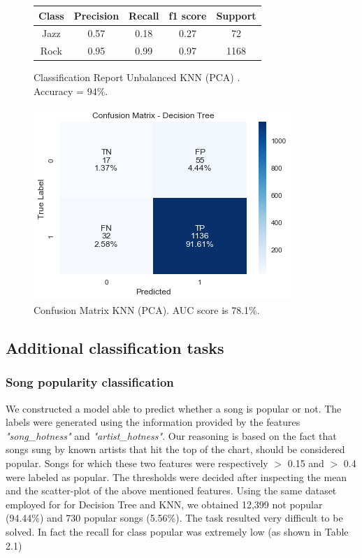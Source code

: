 \begin{figure}[!htb]
   \begin{minipage}{0.56\textwidth}
     \begin{tabular}{ccccc}
     \hline
     \textbf{Class} & \textbf{Precision} & \textbf{Recall} & \textbf{f1 score} & \textbf{Support} \\ \hline
     Jazz          & 0.57               & 0.18            & 0.27        & 72             \\ \hline
     Rock            & 0.95               & 0.99            & 0.97        & 1168            
     \end{tabular}
     \caption{Classification Report Unbalanced KNN (PCA) .\\Accuracy = 94\%.}
     \label{Classification report: Test set Ripper}
   \end{minipage}\hfill
   \begin{minipage}{0.42\textwidth}
     \centering
     \includegraphics[width=0.7\linewidth]{images/cfm-unbalanced-decisiontree.png}
     \caption{Confusion Matrix KNN (PCA). AUC score is 78.1\%. }\label{Fig:Data2}
   \end{minipage}
\end{figure}


\subsection{Additional classification tasks}
\subsubsection{Song popularity classification}
We constructed a model able to predict whether a song is popular or not. The labels were generated using the information provided by the features \textit{"song\_hotness"} and \textit{"artist\_hotness"}. Our reasoning is based on the fact that songs sung by known artists that hit the top of the chart, should be considered popular. Songs for which these two features were respectively $>$ 0.15 and $>$ 0.4 were labeled as popular. The thresholds were decided after inspecting the mean and the scatter-plot of the above mentioned features.
Using the same dataset employed for for Decision Tree and KNN, we obtained 12,399 not popular (94.44\%) and 730 popular songs (5.56\%).
The task resulted very difficult to be solved. In fact the recall for class popular was extremely low (as shown in Table 2.1)

